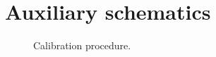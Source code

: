 \documentclass[english,fira]{ist-report}
\begin{document}
\pagebreak
\appendix

\section{Auxiliary schematics}
\begin{figure}[ht]
	\centering
	
	\caption{Calibration procedure.}
	\label{fig:calib}
\end{figure}

\listoftodos

\begin{comment}
\pagebreak

\section{Report Structure}

This should be the report structure according to the class slides (Distributed Real-Time Control Systems, module 32).
\begin{description}
	\item[Abstract] A summary in less than 200 words;
	\item[Introduction] Motivation, challenges, main idea, objectives, outline;
	\item[Background/Concepts] Common knowledge required;
	\item[Related Work] State-of-the-art;
	\item[Development] Your approach, methodologies, innovations;
	\item[Experiments] Carefully explain the design of the experiments;
	\item[Results] Illustrate and comment on the results of experiments;
	\item[Discussion] Maybe in results;
	\item[Conclusions and Future] Critically comment on what was achieved and indicate points of improvement;
	\item[Bibliography]
	\item[Appendices]
\end{description}

Report should be less than 20 pages total, including everything.

\subsection{Discussable Topics}


\end{comment}
\end{document}

